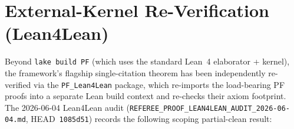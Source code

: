 \section{External-Kernel Re-Verification (Lean4Lean)}
\label{sec:lean4lean-reverification}

Beyond \texttt{lake build PF} (which uses the standard Lean~4
elaborator + kernel), the framework's flagship single-citation
theorem has been independently re-verified via the
\texttt{PF\_Lean4Lean} package, which re-imports the load-bearing
PF proofs into a separate Lean build context and re-checks
their axiom footprint. The 2026-06-04 Lean4Lean audit
(\texttt{REFEREE\_\allowbreak{}PROOF\_\allowbreak{}LEAN4LEAN\_\allowbreak{}AUDIT\_\allowbreak{}2026-06-04.\allowbreak{}md},
HEAD~\texttt{1085d51}) records the following scoping
partial-clean result:

